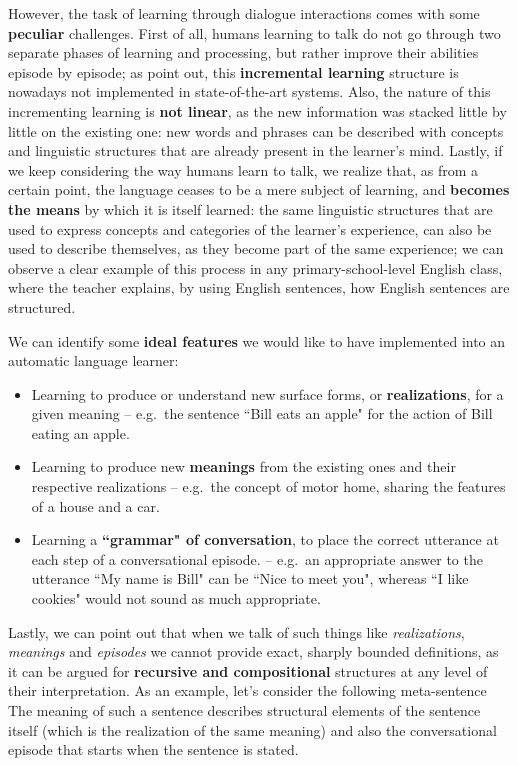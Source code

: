 However, the task of learning through dialogue interactions comes with some \textbf{peculiar} challenges. First of all, humans learning to talk do not go through two separate phases of learning and processing, but rather improve their abilities episode by episode; as \cite{2095408} point out, this \textbf{incremental learning} structure is nowadays not implemented in state-of-the-art systems. Also, the nature of this incrementing learning is \textbf{not linear}, as the new information was stacked little by little on the existing one: new words and phrases can be described with concepts and linguistic structures that are already present in the learner's mind. Lastly, if we keep considering the way humans learn to talk, we realize that, as from a certain point, the language ceases to be a mere subject of learning, and \textbf{becomes the means} by which it is itself learned: the same linguistic structures that are used to express concepts and categories of the learner's experience, can also be used to describe themselves, as they become part of the same experience; we can observe a clear example of this process in any primary-school-level English class, where the teacher explains, by using English sentences, how English sentences are structured.

We can identify some \textbf{ideal features} we would like to have implemented into an automatic language learner:
\begin{itemize}
	\item Learning to produce or understand new surface forms, or \textbf{realizations}, for a given meaning -- e.g.\ the sentence ``Bill eats an apple" for the action of Bill eating an apple.
	\item Learning to produce new \textbf{meanings} from the existing ones and their respective realizations -- e.g.\ the concept of motor home, sharing the features of a house and a car.
	\item Learning a \textbf{``grammar" of conversation}, to place the correct utterance at each step of a conversational episode. -- e.g.\ an appropriate answer to the utterance ``My name is Bill" can be ``Nice to meet you", whereas ``I like cookies" would not sound as much appropriate.
\end{itemize}
Lastly, we can point out that when we talk of such things like \emph{realizations}, \emph{meanings} and \emph{episodes} we cannot provide exact, sharply bounded definitions, as it can be argued for \textbf{recursive and compositional} structures at any level of their interpretation. As an example, let's consider the following meta-sentence  The meaning of such a sentence describes structural elements of the sentence itself (which is the realization of the same meaning) and also the conversational episode that starts when the sentence is stated.

